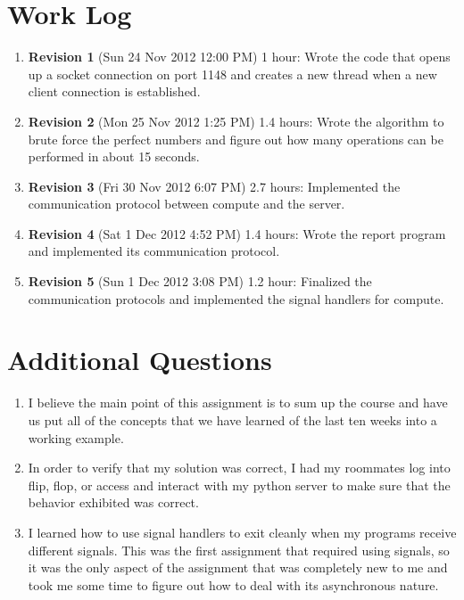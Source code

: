 \documentclass{article}
\begin{document}
\section{Work Log}
\begin{enumerate}
\item \textbf{Revision 1} (Sun 24 Nov 2012 12:00 PM) 1 hour:  Wrote the code that opens up a socket connection on port 1148 and creates a new thread when a new client connection is established.
\item \textbf{Revision 2} (Mon 25 Nov 2012 1:25 PM) 1.4 hours:  Wrote the algorithm to brute force the perfect numbers and figure out how many operations can be performed in about 15 seconds.
\item \textbf{Revision 3} (Fri 30 Nov 2012 6:07 PM) 2.7 hours:  Implemented the communication protocol between compute and the server.
\item \textbf{Revision 4} (Sat 1 Dec 2012 4:52 PM) 1.4 hours:  Wrote the report program and implemented its communication protocol.
\item \textbf{Revision 5} (Sun 1 Dec 2012 3:08 PM) 1.2 hour: Finalized the communication protocols and implemented the signal handlers for compute.

\end{enumerate}


\section{Additional Questions}
\begin{enumerate}
\item I believe the main point of this assignment is to sum up the course and have us put all of the concepts that we have learned of the last ten weeks into a working example.
\item In order to verify that my solution was correct, I had my roommates log into flip, flop, or access and interact with my python server to make sure that the behavior exhibited was correct.
\item I learned how to use signal handlers to exit cleanly when my programs receive different signals.  This was the first assignment that required using signals, so it was the only aspect of the assignment that was completely new to me and took me some time to figure out how to deal with its asynchronous nature.
\end{enumerate}
\end{document}
